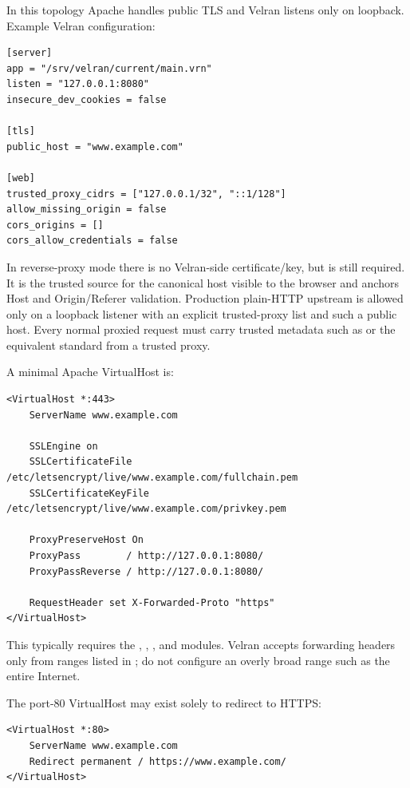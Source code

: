 In this topology Apache handles public TLS and Velran listens only on loopback. Example Velran configuration:

\begin{lstlisting}
[server]
app = "/srv/velran/current/main.vrn"
listen = "127.0.0.1:8080"
insecure_dev_cookies = false

[tls]
public_host = "www.example.com"

[web]
trusted_proxy_cidrs = ["127.0.0.1/32", "::1/128"]
allow_missing_origin = false
cors_origins = []
cors_allow_credentials = false
\end{lstlisting}

In reverse-proxy mode there is no Velran-side certificate/key, but  is still required. It is the trusted source for the canonical host visible to the browser and anchors Host and Origin/Referer validation. Production plain-HTTP upstream is allowed only on a loopback listener with an explicit trusted-proxy list and such a public host. Every normal proxied request must carry trusted metadata such as  or the equivalent standard  from a trusted proxy.

A minimal Apache VirtualHost is:

\begin{lstlisting}
<VirtualHost *:443>
    ServerName www.example.com

    SSLEngine on
    SSLCertificateFile /etc/letsencrypt/live/www.example.com/fullchain.pem
    SSLCertificateKeyFile /etc/letsencrypt/live/www.example.com/privkey.pem

    ProxyPreserveHost On
    ProxyPass        / http://127.0.0.1:8080/
    ProxyPassReverse / http://127.0.0.1:8080/

    RequestHeader set X-Forwarded-Proto "https"
</VirtualHost>
\end{lstlisting}

This typically requires the , , , and  modules. Velran accepts forwarding headers only from ranges listed in ; do not configure an overly broad range such as the entire Internet.

The port-80 VirtualHost may exist solely to redirect to HTTPS:

\begin{lstlisting}
<VirtualHost *:80>
    ServerName www.example.com
    Redirect permanent / https://www.example.com/
</VirtualHost>
\end{lstlisting}

